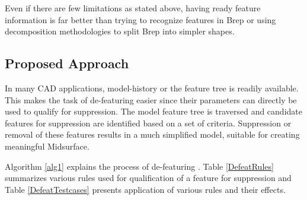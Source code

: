 Even if there are few limitations as stated above, having ready feature information is far better than trying to recognize features in Brep or using decomposition methodologies to split Brep into simpler shapes.


\subsection{Proposed Approach}

In many CAD applications, model-history or the feature tree is readily available. This makes the task of de-featuring easier since their parameters can directly be used to qualify for suppression. The model feature tree is traversed and candidate features for suppression are identified based on a set of criteria. Suppression or removal of these features results in a much simplified model, suitable for creating meaningful Midsurface. 

Algorithm \ref{alg1} explains the process of de-featuring . Table \ref{DefeatRules} summarizes various rules used for qualification of a feature for suppression and Table \ref{DefeatTestcases} presents application of various rules and their effects. 



